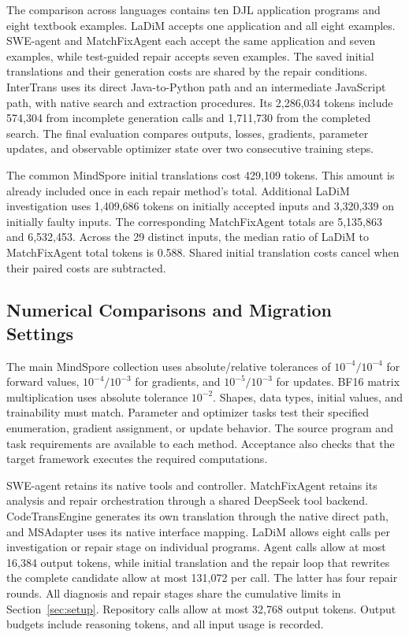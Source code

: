 \documentclass{article}
\begin{document}
The comparison across languages contains ten DJL application programs and eight textbook examples. LaDiM accepts one application and all eight examples. SWE-agent and MatchFixAgent each accept the same application and seven examples, while test-guided repair accepts seven examples. The saved initial translations and their generation costs are shared by the repair conditions. InterTrans uses its direct Java-to-Python path and an intermediate JavaScript path, with native search and extraction procedures. Its 2,286,034 tokens include 574,304 from incomplete generation calls and 1,711,730 from the completed search. The final evaluation compares outputs, losses, gradients, parameter updates, and observable optimizer state over two consecutive training steps.

The common MindSpore initial translations cost 429,109 tokens. This amount is already included once in each repair method's total. Additional LaDiM investigation uses 1,409,686 tokens on initially accepted inputs and 3,320,339 on initially faulty inputs. The corresponding MatchFixAgent totals are 5,135,863 and 6,532,453. Across the 29 distinct inputs, the median ratio of LaDiM to MatchFixAgent total tokens is 0.588. Shared initial translation costs cancel when their paired costs are subtracted.

\subsection{Numerical Comparisons and Migration Settings}
\label{sec:migration-settings}

The main MindSpore collection uses absolute/relative tolerances of $10^{-4}/10^{-4}$ for forward values, $10^{-4}/10^{-3}$ for gradients, and $10^{-5}/10^{-3}$ for updates. BF16 matrix multiplication uses absolute tolerance $10^{-2}$. Shapes, data types, initial values, and trainability must match. Parameter and optimizer tasks test their specified enumeration, gradient assignment, or update behavior. The source program and task requirements are available to each method. Acceptance also checks that the target framework executes the required computations.

SWE-agent retains its native tools and controller. MatchFixAgent retains its analysis and repair orchestration through a shared DeepSeek tool backend. CodeTransEngine generates its own translation through the native direct path, and MSAdapter uses its native interface mapping. LaDiM allows eight calls per investigation or repair stage on individual programs. Agent calls allow at most 16,384 output tokens, while initial translation and the repair loop that rewrites the complete candidate allow at most 131,072 per call. The latter has four repair rounds. All diagnosis and repair stages share the cumulative limits in Section~\ref{sec:setup}. Repository calls allow at most 32,768 output tokens. Output budgets include reasoning tokens, and all input usage is recorded.
\end{document}
